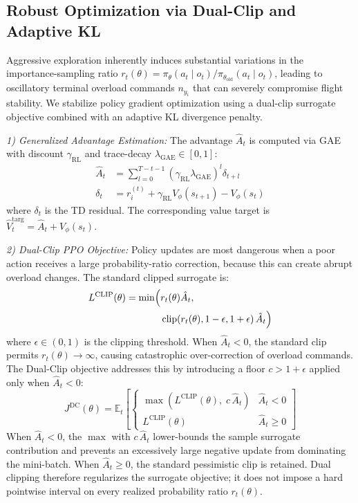 \documentclass[lettersize,journal]{IEEEtran}
\begin{document}
\subsection{Robust Optimization via Dual-Clip and Adaptive KL}
\label{subsec:dual_clip_kl}

Aggressive exploration inherently induces substantial variations in the importance-sampling ratio $r_t(\theta) = \pi_\theta(a_t \mid o_t) / \pi_{\theta_{\mathrm{old}}}(a_t \mid o_t)$, leading to oscillatory terminal overload commands $n_{y_i}$ that can severely compromise flight stability. We stabilize policy gradient optimization using a dual-clip surrogate objective combined with an adaptive KL divergence penalty.

\emph{1) Generalized Advantage Estimation:} The advantage $\hat{A}_t$ is computed via GAE with discount $\gamma_{\mathrm{RL}}$ and trace-decay $\lambda_{\mathrm{GAE}} \in [0,1]$:
\begin{align}
\hat{A}_t &= \sum_{l=0}^{T-t-1} (\gamma_{\mathrm{RL}}\lambda_{\mathrm{GAE}})^l \delta_{t+l} \label{eq:gae_A} \\
\delta_t &= r_i^{(t)} + \gamma_{\mathrm{RL}} V_\phi(s_{t+1}) - V_\phi(s_t) \label{eq:gae_delta}
\end{align}
where $\delta_t$ is the TD residual. The corresponding value target is $\hat{V}_t^{\mathrm{targ}} = \hat{A}_t + V_\phi(s_t)$.

\emph{2) Dual-Clip PPO Objective:} Policy updates are most dangerous when a poor action receives a large probability-ratio correction, because this can create abrupt overload changes. The standard clipped surrogate is:
\begin{equation}
\label{eq:standard_clip}
\begin{split}
L^{\mathrm{CLIP}}(\theta) = \min \Bigl( &r_t(\theta)\hat{A}_t, \\
&\operatorname{clip}\!\left(r_t(\theta), 1-\epsilon, 1+\epsilon\right)\hat{A}_t \Bigr)
\end{split}
\end{equation}
where $\epsilon \in (0,1)$ is the clipping threshold. When $\hat{A}_t < 0$, the standard clip permits $r_t(\theta) \to \infty$, causing catastrophic over-correction of overload commands. The Dual-Clip objective addresses this by introducing a floor $c > 1+\epsilon$ applied only when $\hat{A}_t < 0$:
\begin{equation}
\label{eq:dual_clip_final}
J^{\mathrm{DC}}(\theta) = \mathbb{E}_{t} \left[
\begin{cases}
\max\!\left( L^{\mathrm{CLIP}}(\theta),\; c\,\hat{A}_t \right) & \hat{A}_t < 0 \\[4pt]
L^{\mathrm{CLIP}}(\theta) & \hat{A}_t \geq 0
\end{cases}
\right]
\end{equation}
When $\hat{A}_t < 0$, the $\max$ with $c\,\hat{A}_t$ lower-bounds the
sample surrogate contribution and prevents an excessively large negative
update from dominating the mini-batch. When $\hat{A}_t \geq 0$, the standard
pessimistic clip is retained. Dual clipping therefore regularizes the
surrogate objective; it does not impose a hard pointwise interval on every
realized probability ratio \(r_t(\theta)\).
\end{document}
